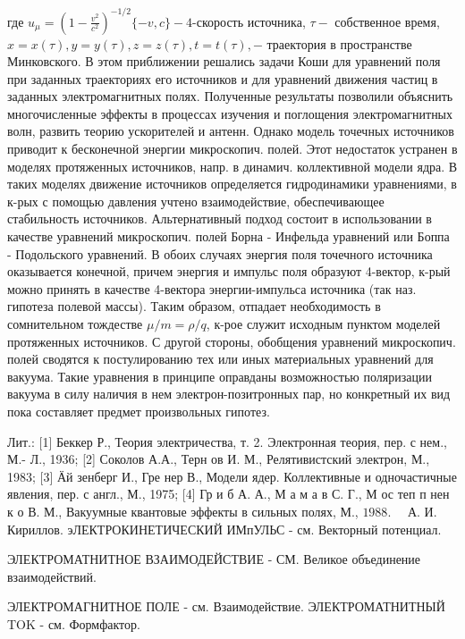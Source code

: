 \documentclass[10pt]{article}
\begin{document}
где $u_{\mu}=\left(1-\frac{v^{2}}{c^{2}}\right)^{-1 / 2}\{-v, c\}-4$-скорость источника, $\tau-$ собственное время, $x=x(\tau), y=y(\tau), z=z(\tau), t=t(\tau),-$ траектория в пространстве Минковского. В этом приближении решались задачи Коши для уравнений поля при заданных траекториях его источников и для уравнений движения частиц в заданных электромагнитных полях. Полученные результаты позволили объяснить многочисленные эффекты в процессах изучения и поглощения электромагнитных волн, развить теорию ускорителей и антенн. Однако модель точечных источников приводит к бесконечной энергии микроскопич. полей. Этот недостаток устранен в моделях протяженных источников, напр. в динамич. коллективной модели ядра. В таких моделях движение источников определяется гидродинамики уравнениями, в к-рых с помощью давления учтено взаимодействие, обеспечивающее стабильность источников. Альтернативный подход состоит в использовании в качестве уравнений микроскопич. полей Борна - Инфельда уравнений или Боппа - Подольского уравнений. В обоих случаях энергия поля точечного источника оказывается конечной, причем энергия и импульс поля образуют 4-вектор, к-рый можно принять в качестве 4-вектора энергии-импульса источника (так наз. гипотеза полевой массы). Таким образом, отпадает необходимость в сомнительном тождестве $\mu / m=\rho / q$, к-рое служит исходным пунктом моделей протяженных источников. С другой стороны, обобщения уравнений микроскопич. полей сводятся к постулированию тех или иных материальных уравнений для вакуума. Такие уравнения в принципе оправданы возможностью поляризации вакуума в силу наличия в нем электрон-позитронных пар, но конкретный их вид пока составляет предмет произвольных гипотез.



Лит.: [1] Беккер Р., Теория электричества, т. 2. Электронная теория, пер. с нем., М.- Л., 1936; [2] Соколов А.А., Терн ов И. М., Релятивистский электрон, М., 1983; [3] Ӓй зенберг И., Гре нер В., Модели ядер. Коллективные и одночастичные явления, пер. с англ., М., 1975; [4] Гр и б А. А., М а м а в С. Г., М ос теп п нен к о В. М., Вакуумные квантовые эффекты в сильных полях, М., $1988 . \quad$ А. И. Кириллов. эЛЕКТРОКИНЕТИЧЕСКИЙ ИМпУЛЬС - см. Векторный потенциал.



ЭЛЕКТРОМАТНИТНОЕ ВЗАИМОДЕЙСТВИЕ - СМ. Великое объединение взаимодействий.



ЭЛЕКТРОМАГНИТНОЕ ПОЛЕ - см. Взаимодействие. ЭЛЕКТРОМАТНИТНЫЙ TOK - см. Формфактор.
\end{document}
